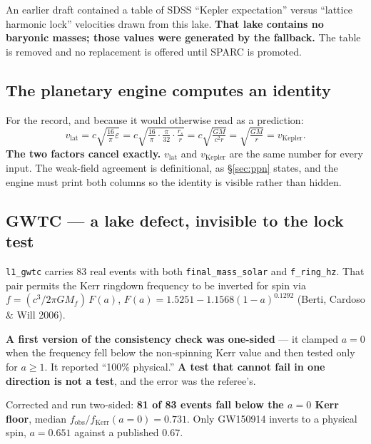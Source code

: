 \documentclass[11pt, letterpaper, openany]{book}
\begin{document}
\begin{correctionbox}
An earlier draft contained a table of SDSS ``Kepler expectation'' versus ``lattice harmonic lock''
velocities drawn from this lake. \textbf{That lake contains no baryonic masses; those values were
generated by the fallback.} The table is removed and no replacement is offered until SPARC is
promoted.
\end{correctionbox}

\subsection*{The planetary engine computes an identity}

For the record, and because it would otherwise read as a prediction:
\[
v_{\text{lat}} = c\sqrt{\tfrac{16}{\pi}\varepsilon}
= c\sqrt{\tfrac{16}{\pi}\cdot\tfrac{\pi}{32}\cdot\tfrac{r_s}{r}}
= c\sqrt{\tfrac{GM}{c^2 r}} = \sqrt{\tfrac{GM}{r}} = v_{\text{Kepler}} .
\]
\textbf{The two factors cancel exactly.} $v_{\text{lat}}$ and $v_{\text{Kepler}}$ are the same
number for every input. The weak-field agreement is definitional, as \S\ref{sec:ppn} states, and the
engine must print both columns so the identity is visible rather than hidden.

\subsection*{GWTC --- a lake defect, invisible to the lock test}

\texttt{l1\_gwtc} carries 83 real events with both \texttt{final\_mass\_solar} and
\texttt{f\_ring\_hz}. That pair permits the Kerr ringdown frequency to be inverted for spin via
$f = (c^3/2\pi GM_f)\,F(a)$, $F(a) = 1.5251 - 1.1568(1-a)^{0.1292}$ (Berti, Cardoso \& Will 2006).

\begin{correctionbox}
\textbf{A first version of the consistency check was one-sided} --- it clamped $a = 0$ when the
frequency fell below the non-spinning Kerr value and then tested only for $a \geq 1$. It reported
``100\% physical.'' \textbf{A test that cannot fail in one direction is not a test}, and the error
was the referee's.

\medskip
Corrected and run two-sided: \textbf{81 of 83 events fall below the $a=0$ Kerr floor}, median
$f_{\text{obs}}/f_{\text{Kerr}}(a{=}0) = 0.731$. Only GW150914 inverts to a physical spin,
$a = 0.651$ against a published $0.67$.
\end{correctionbox}
\end{document}
